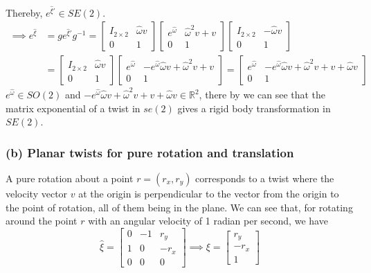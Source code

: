 Thereby, \( e^{\hat \xi'} \in SE(2) \).
\begin{align*}
    \implies
    e^{\hat \xi}
     & =
    g e^{\hat \xi'} g^{-1}
    =
    \begin{bmatrix}
        I_{2\times 2} & \hat \omega v \\
        0             & 1
    \end{bmatrix}
    \begin{bmatrix}
        e^{\hat \omega} & \hat \omega^2 v + v \\
        0               & 1
    \end{bmatrix}
    \begin{bmatrix}
        I_{2\times 2} & -\hat \omega v \\
        0             & 1
    \end{bmatrix}
    \\ & =
    \begin{bmatrix}
        I_{2\times 2} & \hat \omega v \\
        0             & 1
    \end{bmatrix}
    \begin{bmatrix}
        e^{\hat \omega} & - e^{\hat\omega} \hat \omega v + \hat \omega^2 v + v \\
        0               & 1
    \end{bmatrix}
    =
    \begin{bmatrix}
        e^{\hat \omega} & - e^{\hat\omega} \hat \omega v + \hat \omega^2 v + v + \hat \omega v \\
        0               & 1
    \end{bmatrix}
\end{align*}
\( e^{\hat \omega} \in SO(2) \) and \( - e^{\hat\omega} \hat \omega v + \hat \omega^2 v + v + \hat \omega v \in \mathbb{R}^2 \), there by we can see that the matrix exponential of a twist in \( se(2) \) gives a rigid body transformation in \( SE(2) \).

\subsubsection*{(b) Planar twists for pure rotation and translation}

A pure rotation about a point \( r = (r_x, r_y) \) corresponds to a twist where the velocity vector \( v \) at the origin is perpendicular to the vector from the origin to the point of rotation, all of them being in the plane.
We can see that, for rotating around the point \( r \) with an angular velocity of 1 radian per second, we have
\[
    \hat{\xi} = \begin{bmatrix}
        0 & -1 & r_y  \\
        1 & 0  & -r_x \\
        0 & 0  & 0
    \end{bmatrix}
    \implies
    \xi = \begin{bmatrix}
        r_y  \\
        -r_x \\
        1
    \end{bmatrix}
\]

